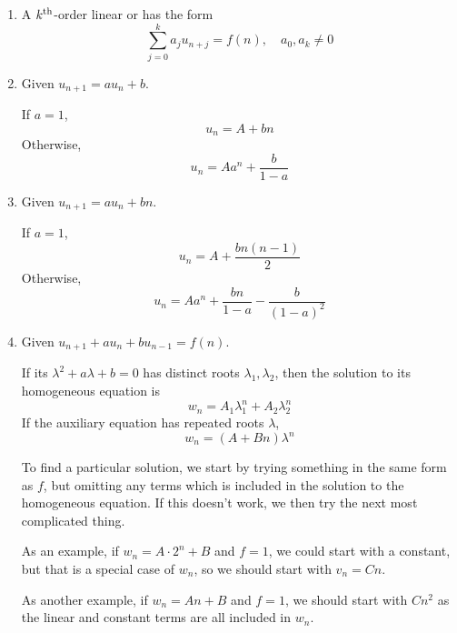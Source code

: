 \documentclass{styles/note}
\begin{document}
  \begin{enumerate}[label=(\alph*)]
    \item A $k\textsuperscript{th}$-order linear  or  has the form
      \[ \sum_{j=0}^k a_j u_{n+j} = f(n), \quad a_0, a_k \neq 0 \]
    
    \item Given $u_{n+1} = au_n + b$. \par
      If $a = 1$,
      \begin{equation}
        u_n = A + bn
      \end{equation}
      Otherwise,
      \begin{equation}
        u_n = A a^n + \frac{b}{1 - a}
      \end{equation}
    
    \item Given $u_{n+1} = au_n + bn$. \par
      If $a = 1$,
      \begin{equation}
        u_n = A + \frac{bn(n-1)}{2}
      \end{equation}
      Otherwise,
      \begin{equation}
        u_n = A a^n + \frac{bn}{1 - a} - \frac{b}{(1 - a)^2}
      \end{equation}
    
    \item Given $u_{n+1} + au_n + bu_{n-1} = f(n)$. \par
      If its  $\lambda^2 + a\lambda + b = 0$ has distinct roots $\lambda_1, \lambda_2$, then the solution to its homogeneous equation is
      \begin{equation}
        w_n = A_1 \lambda_1^n + A_2 \lambda_2^n
      \end{equation}
      If the auxiliary equation has repeated roots $\lambda$,
      \begin{equation}
        w_n = (A + Bn) \lambda^n
      \end{equation}
      
      To find a particular solution, we start by trying something in the same form as $f$, but omitting any terms which is included in the solution to the homogeneous equation. If this doesn't work, we then try the next most complicated thing.
      
      As an example, if $w_n = A \cdot 2^n + B$ and $f = 1$, we could start with a constant, but that is a special case of $w_n$, so we should start with $v_n = Cn$.
      
      As another example, if $w_n = An + B$ and $f = 1$, we should start with $Cn^2$ as the linear and constant terms are all included in $w_n$.
  \end{enumerate}
\end{document}
